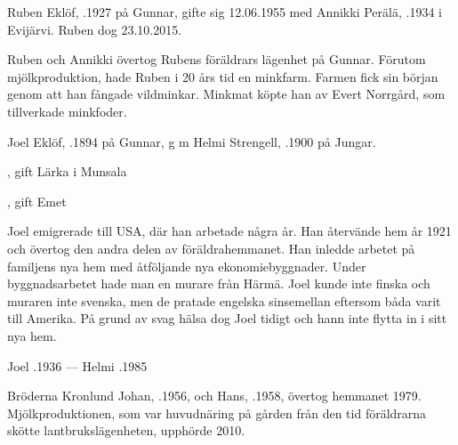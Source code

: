 %
Ruben Eklöf,  .1927 på Gunnar, gifte sig 12.06.1955 med Annikki  Perälä,  .1934 i Evijärvi. Ruben dog 23.10.2015.
\begin{jhchildren}
  \item {}
  \item {}
\end{jhchildren}

Ruben och Annikki övertog Rubens föräldrars lägenhet på Gunnar. Förutom mjölkproduktion, hade Ruben i 20 års tid en minkfarm. Farmen fick sin början genom att han fångade vildminkar. Minkmat köpte han av Evert Norrgård, som tillverkade minkfoder.


%
Joel Eklöf, .1894 på Gunnar, g m Helmi Strengell, .1900 på Jungar.
\begin{jhchildren}
  \item {}, gift Lärka i Munsala
  \item {}
  \item {}, gift Emet
\end{jhchildren}

Joel emigrerade till USA, där han arbetade några år. Han återvände hem år 1921 och övertog den andra delen av föräldrahemmanet. Han inledde arbetet på familjens nya hem med åtföljande nya ekonomiebyggnader. Under byggnadsarbetet hade man en murare från Härmä. Joel kunde inte finska och muraren inte svenska, men de pratade engelska sinsemellan eftersom båda varit till Amerika. På grund av svag hälsa dog Joel tidigt och hann inte flytta in i sitt nya hem.

Joel .1936  ---  Helmi .1985



%



%
Bröderna Kronlund Johan, .1956, och Hans, .1958, övertog hemmanet 1979. Mjölkproduktionen, som var huvudnäring på gården från den tid föräldrarna skötte lantbrukslägenheten, upphörde 2010.

